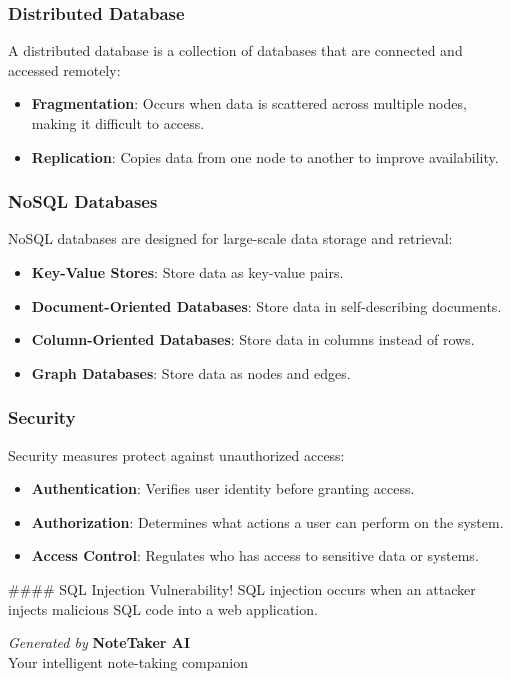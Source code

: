\documentclass[11pt,letterpaper]{article}
\begin{document}
\subsubsection*{Distributed Database}
A distributed database is a collection of databases that are connected and accessed remotely:
\begin{itemize}
  \item \textbf{Fragmentation}: Occurs when data is scattered across multiple nodes, making it difficult to access.
  \item \textbf{Replication}: Copies data from one node to another to improve availability.
\end{itemize}

\subsubsection*{NoSQL Databases}
NoSQL databases are designed for large-scale data storage and retrieval:
\begin{itemize}
  \item \textbf{Key-Value Stores}: Store data as key-value pairs.
  \item \textbf{Document-Oriented Databases}: Store data in self-describing documents.
  \item \textbf{Column-Oriented Databases}: Store data in columns instead of rows.
  \item \textbf{Graph Databases}: Store data as nodes and edges.
\end{itemize}

\subsubsection*{Security}
Security measures protect against unauthorized access:
\begin{itemize}
  \item \textbf{Authentication}: Verifies user identity before granting access.
  \item \textbf{Authorization}: Determines what actions a user can perform on the system.
  \item \textbf{Access Control}: Regulates who has access to sensitive data or systems.
\end{itemize}

#### SQL Injection Vulnerability!
SQL injection occurs when an attacker injects malicious SQL code into a web application.

\vspace{2cm}

\begin{center}
\begin{tcolorbox}[
    colback=primarycolor!5,
    colframe=primarycolor!30,
    boxrule=0.5pt,
    arc=4pt,
    width=0.7\textwidth,
    left=10pt,
    right=10pt,
    top=6pt,
    bottom=6pt
]
    \centering
    \textcolor{primarycolor!80}{\small\textit{Generated by}} \textcolor{primarycolor}{\small\textbf{NoteTaker AI}} \\[-2pt]
    \textcolor{secondarycolor!60}{\tiny Your intelligent note-taking companion}
\end{tcolorbox}
\end{center}
\end{document}
